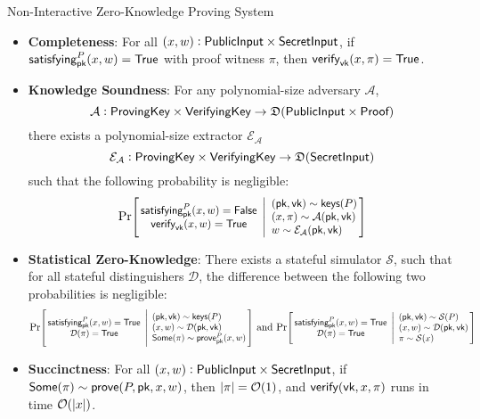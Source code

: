 \begin{definitiontoc}{Non-Interactive Zero-Knowledge Proving System}
    \begin{itemize}
        \item \textbf{Completeness}: For all $(x, w) : {\textsf{PublicInput}} \times {\textsf{SecretInput}}$, if ${\textsf{satisfying}}^P_{\textsf{pk}}(x, w) = {\textsf{True}}$ with proof witness $\pi$, then ${\textsf{verify}}_{\textsf{vk}}(x, \pi) = {\textsf{True}}$.
        \item \textbf{Knowledge Soundness}: For any polynomial-size adversary $\mathcal{A}$,
            \[\mathcal{A} : {\textsf{ProvingKey}} \times {\textsf{VerifyingKey}} \to \mathfrak{D}({\textsf{PublicInput}} \times {\textsf{Proof}})\]
             there exists a polynomial-size extractor $\mathcal{E}_\mathcal{A}$
            \[\mathcal{E}_\mathcal{A} : {\textsf{ProvingKey}} \times {\textsf{VerifyingKey}} \to \mathfrak{D}({\textsf{SecretInput}})\]
            such that the following probability is negligible:
            \[
                \Prob{
                    \satisfying^P_\pk(x, w) = \False \\
                    \verify_\vk(x, w) = \True
                }{
                    (\pk, \vk) \sim \keys(P) \\
                    (x, \pi) \sim \mathcal{A}(\pk, \vk) \\
                    w \sim \mathcal{E}_\mathcal{A}(\pk, \vk)
                }
            \]
        \item \textbf{Statistical Zero-Knowledge}: There exists a stateful simulator $\mathcal{S}$, such that for all stateful distinguishers $\mathcal{D}$, the difference between the following two probabilities is negligible:
            \[
                \Prob{
                    \satisfying^P_\pk(x, w) = \True \\
                    \mathcal{D}(\pi) = \True
                }{
                    (\pk, \vk) \sim \keys(P) \\
                    (x, w) \sim \mathcal{D}(\pk, \vk) \\
                    \Some(\pi) \sim \prove^P_\pk(x, w)
                }
                \,\,\text{and}\,\,
                \Prob{
                    \satisfying^P_\pk(x, w) = \True \\
                    \mathcal{D}(\pi) = \True
                }{
                    (\pk, \vk) \sim \mathcal{S}(P) \\
                    (x, w) \sim \mathcal{D}(\pk, \vk) \\
                    \pi \sim \mathcal{S}(x)
                }
            \]
        \item \textbf{Succinctness}: For all $(x, w) : {\textsf{PublicInput}} \times {\textsf{SecretInput}}$, if ${\textsf{Some}}(\pi) \sim {\textsf{prove}}(P, {\textsf{pk}}, x, w)$, then $\left|\pi\right| = \mathcal{O}(1)$, and ${\textsf{verify}}({\textsf{vk}}, x, \pi)$ runs in time $\mathcal{O}(\left|x\right|)$.
    \end{itemize}
\end{definitiontoc}

